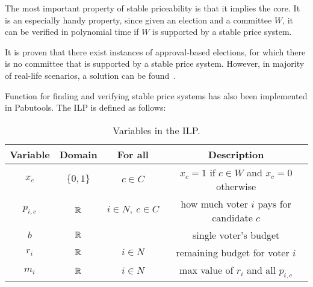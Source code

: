 The most important property of stable priceability is that it implies the core. It is an especially handy property, since given an election and a committee $W$, it can be verified in polynomial time if $W$ is supported by a stable price system.

It is proven that there exist instances of approval-based elections, for which there is no committee that is supported by a stable price system. However, in majority of real-life scenarios, a solution can be found~\cite{SPImplMasters}.

Function for finding and verifying stable price systems has also been implemented in Pabutools. The ILP is defined as follows:
\begin{table}[H]
\renewcommand{\arraystretch}{1.5}
    \centering
    \begin{tabular}{c|c|c|c}
    \hline
    \textbf{Variable} & \textbf{Domain} & \textbf{For all} & \textbf{Description}\\
    \hline
         $x_c$ & $\{0, 1\}$ & $c \in C$ & $x_c=1$ if $c\in W$ and $x_c=0$ otherwise  \\
         $p_{i,c}$ & $\mathbb{R}$ & $i \in N, \ c \in C$ & how much voter $i$ pays for candidate $c$\\
         $b$ & $\mathbb{R}$ & & single voter's budget \\
         $r_i$ & $\mathbb{R}$ & $i \in N$ & remaining budget for voter $i$ \\
         $m_i$ & $\mathbb{R}$ & $i\in N$ & max value of $r_i$ and all $p_{i,c}$
    \end{tabular}
    \caption{Variables in the ILP.}
\end{table}

